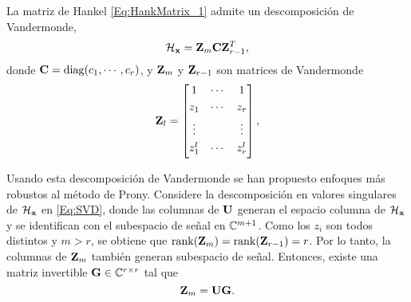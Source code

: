         La matriz de Hankel \eqref{Eq:HankMatrix_1} admite un descomposición de Vandermonde,
		\begin{equation}
		\mathcal{H}_{\mathbf{x}} = \mathbf{Z}_m\mathbf{C}\mathbf{Z}_{r-1}^T,
		\label{Hdecomposition:eq}
		\end{equation}
		donde  $\mathbf{C} =\mathrm{diag}(c_1,\cdots,c_r)$, y $\mathbf{Z}_m$ y $\mathbf{Z}_{r-1}$ son matrices de Vandermonde 
		\begin{equation}
		\mathbf{Z}_l = \begin{bmatrix} 1 & \cdots & 1 \\[0.3em] 
		z_1  & \cdots & z_r \\[0.3em] 
		\vdots  &        & \vdots \\[0.3em]
		z_1^{l} & \cdots & z_r^{l} \\[0.3em]
		\end{bmatrix},
		\label{Eq:VandermondeMatrix}
		\end{equation}
		
        Usando esta descomposición de Vandermonde se han  propuesto enfoques más robustos al método de Prony. Considere la descomposición en valores singulares de $\mathcal{H}_{\mathbf{x}}$ en \eqref{Eq:SVD}, donde las columnas de $\mathbf{U}$ generan el espacio columna de $\mathcal{H}_{\mathbf{x}}$ y se identifican con el subespacio de señal en $\mathbb{C}^{m+1}$. Como los $z_i$  son todos distintos y $m>r$, se obtiene que $\mathrm{rank}(\mathbf{Z}_m)=\mathrm{rank}(\mathbf{Z}_{r-1})=r$. Por lo tanto, la columnas de $\mathbf{Z}_m$ también generan subespacio de señal. Entonces, existe una matriz invertible $\mathbf{G}\in\mathbb{C}^{r\times r}$ tal que 
	\begin{equation}
		\mathbf{Z}_m  = \mathbf{U} \mathbf{G}.
		\label{Zm:eq}
	\end{equation}

